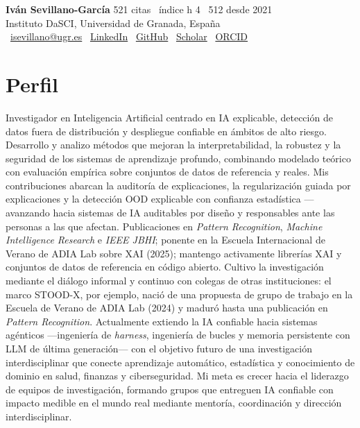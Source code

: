 \documentclass[10pt,a4paper]{article}
\begin{document}
{\Large \textbf{\textcolor{titleblue}{Iván Sevillano-García}}} \hfill {\footnotesize \textcolor{subtle}{521 citas \textbar\ índice h 4 \textbar\ 512 desde 2021}} \\[0.1em]
{\footnotesize Instituto DaSCI, Universidad de Granada, España} \\[0.1em]
{\footnotesize
\faEnvelope\ \href{mailto:isevillano@ugr.es}{isevillano@ugr.es} \quad
\faGlobe\ \href{https://www.linkedin.com/in/iván-sevillano-garcía-304801116}{LinkedIn} \quad
\faGithub\ \href{https://github.com/isega24}{GitHub} \quad
\faGraduationCap\ \href{https://scholar.google.com/citations?user=g5xyauEAAAAJ}{Scholar} \quad
\faOrcid\ \href{https://orcid.org/0000-0002-5029-9106}{ORCID}
}

\vspace{0.2em}

\section*{Perfil}

Investigador en Inteligencia Artificial centrado en IA explicable, detección de datos fuera de distribución y despliegue confiable en ámbitos de alto riesgo. Desarrollo y analizo métodos que mejoran la interpretabilidad, la robustez y la seguridad de los sistemas de aprendizaje profundo, combinando modelado teórico con evaluación empírica sobre conjuntos de datos de referencia y reales. Mis contribuciones abarcan la auditoría de explicaciones, la regularización guiada por explicaciones y la detección OOD explicable con confianza estadística --- avanzando hacia sistemas de IA auditables por diseño y responsables ante las personas a las que afectan. Publicaciones en \textit{Pattern Recognition}, \textit{Machine Intelligence Research} e \textit{IEEE JBHI}; ponente en la Escuela Internacional de Verano de ADIA Lab sobre XAI (2025); mantengo activamente librerías XAI y conjuntos de datos de referencia en código abierto. Cultivo la investigación mediante el diálogo informal y continuo con colegas de otras instituciones: el marco STOOD-X, por ejemplo, nació de una propuesta de grupo de trabajo en la Escuela de Verano de ADIA Lab (2024) y maduró hasta una publicación en \textit{Pattern Recognition}. Actualmente extiendo la IA confiable hacia sistemas agénticos ---ingeniería de \textit{harness}, ingeniería de bucles y memoria persistente con LLM de última generación--- con el objetivo futuro de una investigación interdisciplinar que conecte aprendizaje automático, estadística y conocimiento de dominio en salud, finanzas y ciberseguridad. Mi meta es crecer hacia el liderazgo de equipos de investigación, formando grupos que entreguen IA confiable con impacto medible en el mundo real mediante mentoría, coordinación y dirección interdisciplinar.
\end{document}
